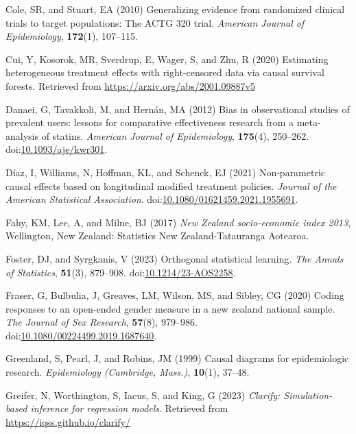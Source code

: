 \documentclass[
  singlecolumn]{article}
\newlength{\cslhangindent}
\newenvironment{CSLReferences}[2] %
 {\begin{list}{}{%
  \setlength{\itemindent}{0pt}
  \setlength{\leftmargin}{0pt}
  \setlength{\parsep}{0pt}
  \ifodd #1
   \setlength{\leftmargin}{\cslhangindent}
   \setlength{\itemindent}{-1\cslhangindent}
  \fi
  \setlength{\itemsep}{#2\baselineskip}}}
 {\end{list}}
\begin{document}
\begin{CSLReferences}{1}{0}
Cole, SR, and Stuart, EA (2010) Generalizing evidence from randomized
clinical trials to target populations: The ACTG 320 trial.
\emph{American Journal of Epidemiology}, \textbf{172}(1), 107--115.

Cui, Y, Kosorok, MR, Sverdrup, E, Wager, S, and Zhu, R (2020) Estimating
heterogeneous treatment effects with right-censored data via causal
survival forests. Retrieved from
\url{https://arxiv.org/abs/2001.09887v5}

Danaei, G, Tavakkoli, M, and Hernán, MA (2012) Bias in observational
studies of prevalent users: lessons for comparative effectiveness
research from a meta-analysis of statins. \emph{American Journal of
Epidemiology}, \textbf{175}(4), 250--262.
doi:\href{https://doi.org/10.1093/aje/kwr301}{10.1093/aje/kwr301}.

Díaz, I, Williams, N, Hoffman, KL, and Schenck, EJ (2021) Non-parametric
causal effects based on longitudinal modified treatment policies.
\emph{Journal of the American Statistical Association}.
doi:\href{https://doi.org/10.1080/01621459.2021.1955691}{10.1080/01621459.2021.1955691}.

Fahy, KM, Lee, A, and Milne, BJ (2017) \emph{New Zealand socio-economic
index 2013}, Wellington, New Zealand: Statistics New Zealand-Tatauranga
Aotearoa.

Foster, DJ, and Syrgkanis, V (2023) Orthogonal statistical learning.
\emph{The Annals of Statistics}, \textbf{51}(3), 879--908.
doi:\href{https://doi.org/10.1214/23-AOS2258}{10.1214/23-AOS2258}.

Fraser, G, Bulbulia, J, Greaves, LM, Wilson, MS, and Sibley, CG (2020)
Coding responses to an open-ended gender measure in a new zealand
national sample. \emph{The Journal of Sex Research}, \textbf{57}(8),
979--986.
doi:\href{https://doi.org/10.1080/00224499.2019.1687640}{10.1080/00224499.2019.1687640}.

Greenland, S, Pearl, J, and Robins, JM (1999) Causal diagrams for
epidemiologic research. \emph{Epidemiology (Cambridge, Mass.)},
\textbf{10}(1), 37--48.

Greifer, N, Worthington, S, Iacus, S, and King, G (2023) \emph{Clarify:
Simulation-based inference for regression models}. Retrieved from
\url{https://iqss.github.io/clarify/}


\end{CSLReferences}
\end{document}

